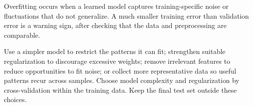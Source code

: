Overfitting occurs when a learned model captures training-specific noise or fluctuations that do not generalize. A much smaller training error than validation error is a warning sign, after checking that the data and preprocessing are comparable.


Use a simpler model to restrict the patterns it can fit; strengthen suitable regularization to discourage excessive weights; remove irrelevant features to reduce opportunities to fit noise; or collect more representative data so useful patterns recur across samples. Choose model complexity and regularization by cross-validation within the training data. Keep the final test set outside these choices.
